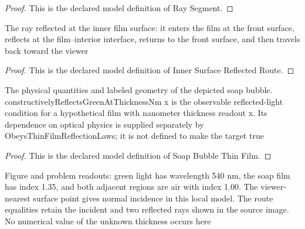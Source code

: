 \begin{proof}
  This is the declared model definition of Ray Segment.
\end{proof}
\begin{definition}
  \label{def:physics:phyx-mini-0127:phyxminiproblems-problemphyxmini0127-innersurfacereflectedroute}
  The ray reflected at the inner film surface: it enters the film at the front surface, reflects at the film--interior interface, returns to the front surface, and then travels back toward the viewer
\end{definition}
\begin{proof}
  This is the declared model definition of Inner Surface Reflected Route.
\end{proof}
\begin{definition}
  \label{def:physics:phyx-mini-0127:phyxminiproblems-problemphyxmini0127-soapbubblethinfilm}
  The physical quantities and labeled geometry of the depicted soap bubble. constructivelyReflectsGreenAtThicknessNm x is the observable reflected-light condition for a hypothetical film with nanometer thickness readout x. Its dependence on optical physics is supplied separately by ObeysThinFilmReflectionLaws; it is not defined to make the target true
\end{definition}
\begin{proof}
  This is the declared model definition of Soap Bubble Thin Film.
\end{proof}
\begin{definition}
  \label{def:physics:phyx-mini-0127:phyxminiproblems-problemphyxmini0127-matchessoapbubblefigure}
  Figure and problem readouts: green light has wavelength 540 nm, the soap film has index 1.35, and both adjacent regions are air with index 1.00. The viewer-nearest surface point gives normal incidence in this local model. The route equalities retain the incident and two reflected rays shown in the source image. No numerical value of the unknown thickness occurs here
\end{definition}

